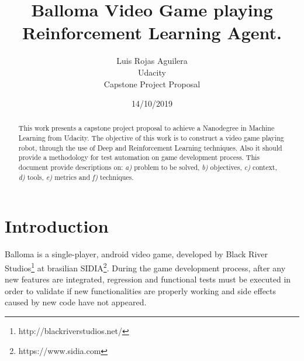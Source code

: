 \documentclass[peerreview]{IEEEtran}
\begin{document}
\title{Balloma Video Game playing Reinforcement Learning Agent.}



\author{Luis Rojas Aguilera \\
Udacity\\
Capstone Project Proposal\\
}
\date{14/10/2019}

\maketitle
\tableofcontents
\listoffigures
\listoftables

\IEEEpeerreviewmaketitle
\begin{abstract}

  This work presents a capstone project proposal to achieve a Nanodegree in Machine Learning from Udacity. The objective of this work is to construct a video game playing robot, through the use of Deep and Reinforcement Learning techniques. Also it should provide a methodology for test automation on game development process. This document provide descriptions on: \textit{a)} problem to be solved, \textit{b)} objectives, \textit{c)} context, \textit{d)} tools, \textit{e)} metrics and \textit{f)} techniques.

\end{abstract}


\section{Introduction}
Balloma is a single-player, android video game, developed by Black River Studios\footnote{http://blackriverstudios.net/} at brasilian SIDIA\footnote{https://www.sidia.com}.  During the game development process, after any new features are integrated, regression and functional tests must be executed in order to validate if new functionalities are properly working and side effects caused by new code have not appeared. 
\end{document}

